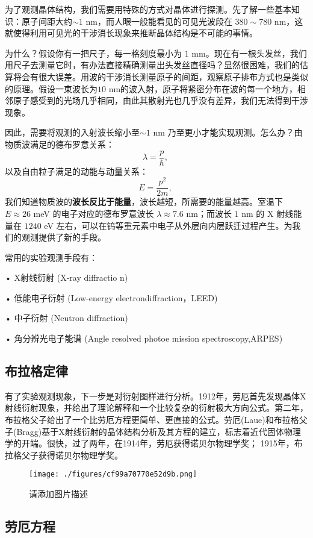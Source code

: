 
为了观测晶体结构，我们需要用特殊的方式对晶体进行探测。先了解一些基本知识：原子间距大约$\sim 1$ nm，而人眼一般能看见的可见光波段在 $380 \sim 780 $ nm，这就使得利用可见光的干涉消长现象来推断晶体结构是不可能的事情。

为什么？假设你有一把尺子，每一格刻度最小为 $1$ mm。现在有一根头发丝，我们用尺子去测量它时，有办法直接精确测量出头发丝直径吗？显然很困难，我们的估算将会有很大误差。用波的干涉消长测量原子的间距，观察原子排布方式也是类似的原理。假设一束波长为$10$ nm的波入射，原子将紧密分布在波的每一个地方，相邻原子感受到的光场几乎相同，由此其散射光也几乎没有差异，我们无法得到干涉现象。

因此，需要将观测的入射波长缩小至$\sim 1$ nm 乃至更小才能实现观测。怎么办？由物质波满足的德布罗意关系：
\begin{equation}
\lambda = \dfrac{p}{\hbar},~
\end{equation}
以及自由粒子满足的动能与动量关系：
\begin{equation}
E = \dfrac{p^2}{2 m},~
\end{equation}
我们知道物质波的\textbf{波长反比于能量}，波长越短，所需要的能量越高。室温下 $E \approx 26 $ meV 的电子对应的德布罗意波长 $\lambda \approx  7.6 $ nm；而波长 $1$ nm 的 X 射线能量在 $1240$ eV 左右，可以在钨等重元素中电子从外层向内层跃迁过程产生。为我们的观测提供了新的手段。

常用的实验观测手段有：

• X射线衍射 (X-ray diffractio n)

• 低能电子衍射 (Low-energy electrondiffraction，LEED)

• 中子衍射 (Neutron diffraction)

• 角分辨光电子能谱 (Angle resolved photoe mission spectroscopy,ARPES)

\subsection{布拉格定律}
有了实验观测现象，下一步是对衍射图样进行分析。1912年，劳厄首先发现晶体X射线衍射现象，并给出了理论解释和一个比较复杂的衍射极大方向公式。第二年，布拉格父子给出了一个比劳厄方程更简单、更直接的公式。劳厄(Laue)和布拉格父子(Bragg)基于X射线衍射的晶体结构分析及其方程的建立，标志着近代固体物理学的开端。很快，过了两年，在1914年，劳厄获得诺贝尔物理学奖； 1915年，布拉格父子获得诺贝尔物理学奖。

\begin{figure}[ht]
\centering
\texttt{[image: ./figures/cf99a70770e52d9b.png]}
\caption{请添加图片描述} \label{fig_RecLat_1}
\end{figure}



\subsection{劳厄方程}